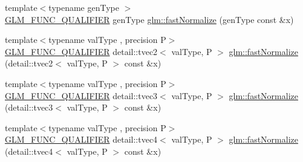 \begin{DoxyCompactItemize}
{\footnotesize template$<$typename gen\+Type $>$ }\\\hyperlink{setup_8hpp_a33fdea6f91c5f834105f7415e2a64407}{G\+L\+M\+\_\+\+F\+U\+N\+C\+\_\+\+Q\+U\+A\+L\+I\+F\+I\+ER} gen\+Type \hyperlink{group__gtx__fast__square__root_ga3b02c1d6e0c754144e2f1e110bf9f16c}{glm\+::fast\+Normalize} (gen\+Type const \&x)
\item 
{\footnotesize template$<$typename val\+Type , precision P$>$ }\\\hyperlink{setup_8hpp_a33fdea6f91c5f834105f7415e2a64407}{G\+L\+M\+\_\+\+F\+U\+N\+C\+\_\+\+Q\+U\+A\+L\+I\+F\+I\+ER} detail\+::tvec2$<$ val\+Type, P $>$ \hyperlink{namespaceglm_a5a77e7b85b5e1625b045f168c4c8a68e}{glm\+::fast\+Normalize} (detail\+::tvec2$<$ val\+Type, P $>$ const \&x)
\item 
{\footnotesize template$<$typename val\+Type , precision P$>$ }\\\hyperlink{setup_8hpp_a33fdea6f91c5f834105f7415e2a64407}{G\+L\+M\+\_\+\+F\+U\+N\+C\+\_\+\+Q\+U\+A\+L\+I\+F\+I\+ER} detail\+::tvec3$<$ val\+Type, P $>$ \hyperlink{namespaceglm_a79d69adf577a32f7767c7471cb8b43ea}{glm\+::fast\+Normalize} (detail\+::tvec3$<$ val\+Type, P $>$ const \&x)
\item 
{\footnotesize template$<$typename val\+Type , precision P$>$ }\\\hyperlink{setup_8hpp_a33fdea6f91c5f834105f7415e2a64407}{G\+L\+M\+\_\+\+F\+U\+N\+C\+\_\+\+Q\+U\+A\+L\+I\+F\+I\+ER} detail\+::tvec4$<$ val\+Type, P $>$ \hyperlink{namespaceglm_afc8a546d803a5a95bc5a85423f757907}{glm\+::fast\+Normalize} (detail\+::tvec4$<$ val\+Type, P $>$ const \&x)
\end{DoxyCompactItemize}
